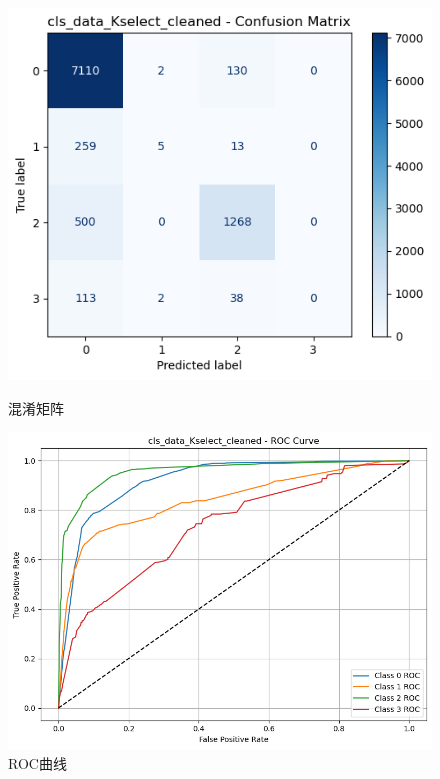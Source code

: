 \documentclass[10pt]{article}
\begin{document}
\begin{figure}[H]
\centering
\begin{minipage}[t]{0.45\textwidth}
  \centering
  \includegraphics[width=\linewidth]{cls_log_10sc.png}
  \caption{混淆矩阵}
  \label{fig:41}
\end{minipage}
\hfill
\begin{minipage}[t]{0.52\textwidth}
  \centering
  \includegraphics[width=\linewidth]{cls_log_10sc2.png}
  \caption{ROC曲线}
  \label{fig:42}
\end{minipage}
\end{figure}
\end{document}
